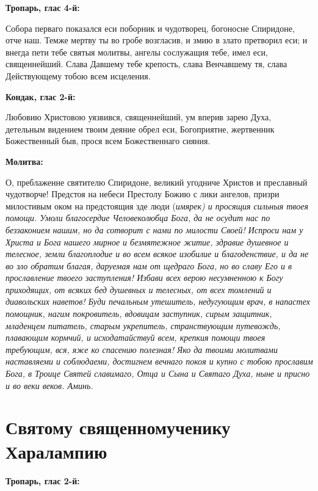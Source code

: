 \bfseries Тропарь, глас 4-й:\normalfont{}


Собора перваго показался еси поборник и чудотворец, богоносне Спиридоне, отче наш. Темже мертву ты во гробе возгласив, и змию в злато претворил еси; и внегда пети тебе святыя молитвы, ангелы сослужащия тебе, имел еси, священнейший. Слава Давшему тебе крепость, слава Венчавшему тя, слава Действующему тобою всем исцеления.


\medskip


\bfseries Кондак, глас 2-й:\normalfont{}


Любовию Христовою уязвився, священнейший, ум вперив зарею Духа, детельным видением твоим деяние обрел еси, Богоприятне, жертвенник Божественный быв, прося всем Божественнаго сияния.


\medskip


\bfseries Молитва:\normalfont{}


О, преблаженне святителю Спиридоне, великий угодниче Христов и преславный чудотворче! Предстоя на небеси Престолу Божию с лики ангелов, призри милостивым оком на предстоящия зде люди (\itshape имярек\normalfont{}) и просящия сильныя твоея помощи. Умоли благосердие Человеколюбца Бога, да не осудит нас по беззаконием нашим, но да сотворит с нами по милости Своей! Испроси нам у Христа и Бога нашего мирное и безмятежное житие, здравие душевное и телесное, земли благоплодие и во всем всякое изобилие и благоденствие, и да не во зло обратим благая, даруемая нам от щедраго Бога, но во славу Его и в прославление твоего заступления! Избави всех верою несумненною к Богу приходящих, от всяких бед душевных и телесных, от всех томлений и диавольских наветов! Буди печальным утешитель, недугующим врач, в напастех помощник, нагим покровитель, вдовицам заступник, сирым защитник, младенцем питатель, старым укрепитель, странствующим путевождь, плавающим кормчий, и исходатайствуй всем, крепкия помощи твоея требующим, вся, яже ко спасению полезная! Яко да твоими молитвами наставляеми и соблюдаеми, достигнем вечнаго покоя и купно с тобою прославим Бога, в Троице Святей славимаго, Отца и Сына и Святаго Духа, ныне и присно и во веки веков. Аминь.


\section{Святому священномученику Харалампию}
 


\bfseries Тропарь, глас 2-й:\normalfont{}


